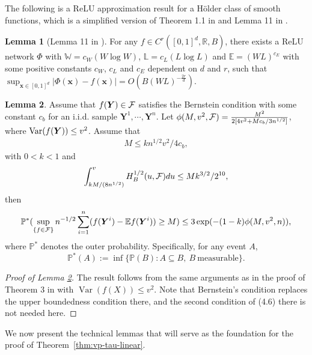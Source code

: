 \documentclass[12pt]{article}
\theoremstyle{definition} %
\newtheorem{lemma}{Lemma}
\newcommand{\Var}{\operatorname{Var}}
\newcommand{\R}{\mathbb{R}}
\renewcommand{\P}{\ensuremath{\mathbb{P}}} %
\newcommand{\Y}{\bm Y}
\newcommand{\x}{\bm x}
\providecommand{\E}{\mathbb{E}}
\begin{document}
The following is a ReLU approximation result for a H\"older class of smooth functions, which is a simplified version of Theorem 1.1 in \cite{lu2021deep} and Lemma 11 in \cite{huang2022error}.
\begin{lemma}[Lemma 11 in \cite{huang2022error}]
\label{l_approx_nn}
 For any $f\in{C}^{r}([0,1]^{d},\R,B)$, there exists a ReLU network $\Phi$ with $\mathbb{W}=c_W(W\log W)$, $\mathbb{L}=c_L(L\log L)$ and $\mathbb{E}=(WL)^{c_E}$ with some positive constants $c_W$, $c_L$ and $c_E$ dependent on $d$ and $r$, such that $
 \sup_{\x\in[0,1]^{d}}|\Phi(\x)-f(\x)|=O( B (WL)^{-\frac{2r}{d}})
 $. 
\end{lemma}

\begin{lemma}
\label{large-d}
Assume that $f(\Y) \in \cal F$ satisfies the Bernstein condition with some constant $c_b$ for an i.i.d. sample $\Y^1,\cdots,\Y^n$. Let $\phi (M,v^2,{\cal F})=\frac{M^{2}}{2[4v^2+ M c_b /3 n^{1/2}]}$, 
where ${\rm Var}(f(\Y)) \leq v^2$. Assume that 
\begin{eqnarray}
\label{mean-var}
M \leq k n^{1/2} v^2/4c_b, 
\end{eqnarray}
with $0<k<1$ and
\begin{eqnarray}
\label{entropy0}
\int_{k M/(8 n^{1/2})}^{v} H_B^{1/2}(u,{\cal F}) du \leq M k^{3/2}/2^{10},
\end{eqnarray}
then 
\[ \P^{*}(\sup_{\{f \in {\cal F}\}} n^{-1/2} \sum_{i=1}^n (f(\Y^i) -\E f(\Y^i)) \geq M) \leq 3
\exp(-(1-k) \phi(M,v^2,n)), \]
where $\P^{*}$ denotes the outer probability. Specifically, for any event $A$,
\[
\P^{*}(A):=\inf\{\P(B):A\subseteq B,\ B\ \text{measurable}\}.
\]
\end{lemma}


\begin{proof}[Proof of Lemma \ref{large-d}]
The result follows from the same arguments as in the proof of Theorem 3 in \cite{shen1994convergence} with $\Var(f(X)) \leq v^2$. 
Note that Bernstein's condition replaces the upper boundedness condition
there, and the second condition of (4.6) there is not needed here. 
\end{proof}


\newcommand{\ip}[2]{\left\langle #1,#2 \right\rangle}

We now present the technical lemmas that will serve as the foundation for the proof of Theorem~\ref{thm:vp-tau-linear}.
\end{document}
